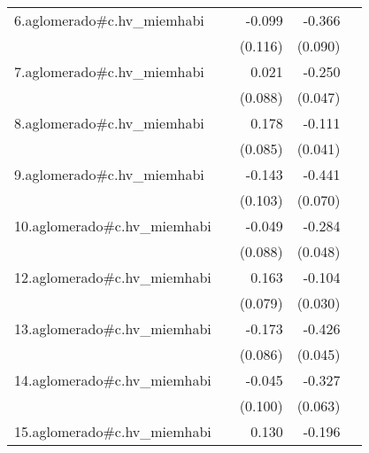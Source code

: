 {\begin{longtable}{l*{4}{D{.}{.}{-1}}}
\addlinespace
6.aglomerado#c.hv\_miemhabi&                     &      -0.099         &      -0.366\sym{***}&                     \\
            &                     &     (0.116)         &     (0.090)         &                     \\
\addlinespace
7.aglomerado#c.hv\_miemhabi&                     &       0.021         &      -0.250\sym{***}&                     \\
            &                     &     (0.088)         &     (0.047)         &                     \\
\addlinespace
8.aglomerado#c.hv\_miemhabi&                     &       0.178\sym{*}  &      -0.111\sym{**} &                     \\
            &                     &     (0.085)         &     (0.041)         &                     \\
\addlinespace
9.aglomerado#c.hv\_miemhabi&                     &      -0.143         &      -0.441\sym{***}&                     \\
            &                     &     (0.103)         &     (0.070)         &                     \\
\addlinespace
10.aglomerado#c.hv\_miemhabi&                     &      -0.049         &      -0.284\sym{***}&                     \\
            &                     &     (0.088)         &     (0.048)         &                     \\
\addlinespace
12.aglomerado#c.hv\_miemhabi&                     &       0.163\sym{*}  &      -0.104\sym{***}&                     \\
            &                     &     (0.079)         &     (0.030)         &                     \\
\addlinespace
13.aglomerado#c.hv\_miemhabi&                     &      -0.173\sym{*}  &      -0.426\sym{***}&                     \\
            &                     &     (0.086)         &     (0.045)         &                     \\
\addlinespace
14.aglomerado#c.hv\_miemhabi&                     &      -0.045         &      -0.327\sym{***}&                     \\
            &                     &     (0.100)         &     (0.063)         &                     \\
\addlinespace
15.aglomerado#c.hv\_miemhabi&                     &       0.130         &      -0.196\sym{**} &                     \\

\end{longtable}}

